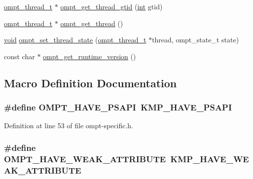 \begin{DoxyCompactItemize}
\item 
\hyperlink{ompt-specific_8h_aba08ad17c82d2eea9f877a3ec41e4987}{ompt\-\_\-thread\-\_\-t} $\ast$ \hyperlink{ompt-specific_8h_ad45cea0d0edab64c7c1059332cba7bc9}{ompt\-\_\-get\-\_\-thread\-\_\-gtid} (\hyperlink{ittnotify__static_8h_a8b8dcd723308a8cb5d84277c7a3fff70}{int} gtid)
\item 
\hyperlink{ompt-specific_8h_aba08ad17c82d2eea9f877a3ec41e4987}{ompt\-\_\-thread\-\_\-t} $\ast$ \hyperlink{ompt-specific_8h_ae3f900aeae1828089c356b1db2be6fee}{ompt\-\_\-get\-\_\-thread} ()
\item 
\hyperlink{ittnotify__static_8h_af941d56e55e3c5465135b60c4d6343ed}{void} \hyperlink{ompt-specific_8h_a1e85c69bf0473ba8ab8bd3229cd7dd85}{ompt\-\_\-set\-\_\-thread\-\_\-state} (\hyperlink{ompt-specific_8h_aba08ad17c82d2eea9f877a3ec41e4987}{ompt\-\_\-thread\-\_\-t} $\ast$thread, ompt\-\_\-state\-\_\-t state)
\item 
const char $\ast$ \hyperlink{ompt-specific_8h_adea507da3b254586f65079dd92c5048b}{ompt\-\_\-get\-\_\-runtime\-\_\-version} ()
\end{DoxyCompactItemize}


\subsection{Macro Definition Documentation}
\hypertarget{ompt-specific_8h_a4cf91dcbe0e02f798a590ca7b9558774}{
\subsubsection[{O\-M\-P\-T\-\_\-\-H\-A\-V\-E\-\_\-\-P\-S\-A\-P\-I}]{\setlength{\rightskip}{0pt plus 5cm}\#define O\-M\-P\-T\-\_\-\-H\-A\-V\-E\-\_\-\-P\-S\-A\-P\-I~K\-M\-P\-\_\-\-H\-A\-V\-E\-\_\-\-P\-S\-A\-P\-I}}\label{ompt-specific_8h_a4cf91dcbe0e02f798a590ca7b9558774}


Definition at line 53 of file ompt-\/specific.\-h.

\hypertarget{ompt-specific_8h_a05d814d61d3310d6018db42f447891d3}{
\subsubsection[{O\-M\-P\-T\-\_\-\-H\-A\-V\-E\-\_\-\-W\-E\-A\-K\-\_\-\-A\-T\-T\-R\-I\-B\-U\-T\-E}]{\setlength{\rightskip}{0pt plus 5cm}\#define O\-M\-P\-T\-\_\-\-H\-A\-V\-E\-\_\-\-W\-E\-A\-K\-\_\-\-A\-T\-T\-R\-I\-B\-U\-T\-E~K\-M\-P\-\_\-\-H\-A\-V\-E\-\_\-\-W\-E\-A\-K\-\_\-\-A\-T\-T\-R\-I\-B\-U\-T\-E}}\label{ompt-specific_8h_a05d814d61d3310d6018db42f447891d3}


